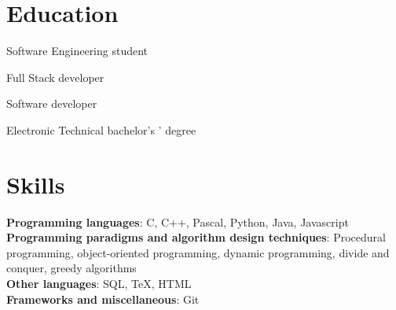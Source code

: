 \documentclass{resume}
\begin{document}
\section{Education}

Software Engineering student

Full Stack developer

Software developer

Electronic Technical bachelor's ’ degree

\section{Skills}
\smallskip
\textbf{Programming languages}: C, C++, Pascal, Python, Java, Javascript \\
\textbf{Programming paradigms and algorithm design techniques}: Procedural programming, object-oriented programming, dynamic programming, divide and conquer, greedy algorithms \\
\textbf{Other languages}: SQL, TeX, HTML \\
\textbf{Frameworks and miscellaneous}: Git \\
\end{document}
